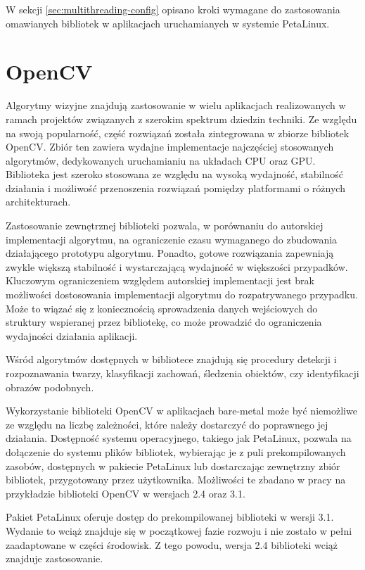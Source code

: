 W sekcji \ref{sec:multithreading-config} opisano kroki wymagane do zastosowania omawianych bibliotek w aplikacjach uruchamianych w systemie PetaLinux.
\section{OpenCV}
\label{sec:opencv-lib}

Algorytmy wizyjne znajdują zastosowanie w wielu aplikacjach realizowanych w ramach projektów związanych z szerokim spektrum dziedzin techniki. Ze względu na swoją popularność, część rozwiązań została zintegrowana w zbiorze bibliotek OpenCV. \cite{opencv-library} Zbiór ten zawiera wydajne implementacje najczęściej stosowanych algorytmów, dedykowanych uruchamianiu na układach CPU oraz GPU. Biblioteka jest szeroko stosowana ze względu na wysoką wydajność, stabilność działania i możliwość przenoszenia rozwiązań pomiędzy platformami o różnych architekturach.

Zastosowanie zewnętrznej biblioteki pozwala, w porównaniu do autorskiej implementacji algorytmu, na ograniczenie czasu wymaganego do zbudowania działającego prototypu algorytmu. Ponadto, gotowe rozwiązania zapewniają zwykle większą stabilność i wystarczającą wydajność w większości przypadków. Kluczowym ograniczeniem względem autorskiej implementacji jest brak możliwości dostosowania implementacji algorytmu do rozpatrywanego przypadku. Może to wiązać się z koniecznością sprowadzenia danych wejściowych do struktury wspieranej przez bibliotekę, co może prowadzić do ograniczenia wydajności działania aplikacji.

Wśród algorytmów dostępnych w bibliotece znajdują się procedury detekcji i rozpoznawania twarzy, klasyfikacji zachowań, śledzenia obiektów, czy identyfikacji obrazów podobnych.

Wykorzystanie biblioteki OpenCV w aplikacjach bare-metal może być niemożliwe ze względu na liczbę zależności, które należy dostarczyć do poprawnego jej działania. Dostępność systemu operacyjnego, takiego jak PetaLinux, pozwala na dołączenie do systemu plików bibliotek, wybierając je z puli prekompilowanych zasobów, dostępnych w pakiecie PetaLinux lub dostarczając zewnętrzny zbiór bibliotek, przygotowany przez użytkownika. Możliwości te zbadano w pracy na przykładzie biblioteki OpenCV w wersjach 2.4 oraz 3.1.

Pakiet PetaLinux oferuje dostęp do prekompilowanej biblioteki w wersji 3.1. Wydanie to wciąż znajduje się w początkowej fazie rozwoju i nie zostało w pełni zaadaptowane w części środowisk. Z tego powodu, wersja 2.4 biblioteki wciąż znajduje zastosowanie.

